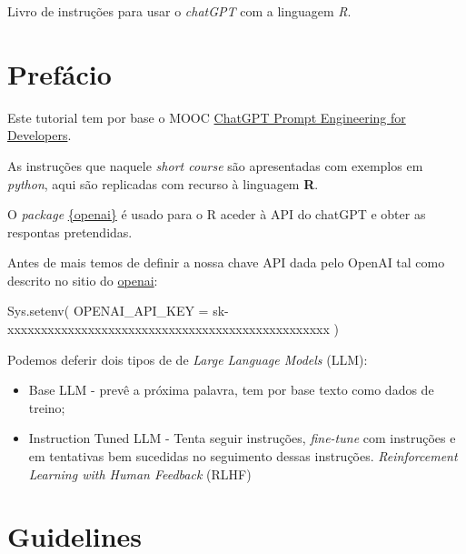 \documentclass[
  letterpaper,
  paper=6in:9in,
  pagesize=pdftex,
  headinclude=on,
  footinclude=on,
  12pt]{scrbook}
\newenvironment{Shaded}{\begin{snugshade}}{\end{snugshade}}
\newcommand{\AttributeTok}[1]{\textcolor[rgb]{0.40,0.45,0.13}{#1}}
\newcommand{\FunctionTok}[1]{\textcolor[rgb]{0.28,0.35,0.67}{#1}}
\newcommand{\NormalTok}[1]{\textcolor[rgb]{0.00,0.23,0.31}{#1}}
\newcommand{\StringTok}[1]{\textcolor[rgb]{0.13,0.47,0.30}{#1}}
\begin{document}
Livro de instruções para usar o \emph{chatGPT} com a linguagem \emph{R}.


\hypertarget{prefuxe1cio}{%
\chapter{Prefácio}\label{prefuxe1cio}}

Este tutorial tem por base o MOOC
\href{https://learn.deeplearning.ai/}{ChatGPT Prompt Engineering for
Developers}.

As instruções que naquele \emph{short course} são apresentadas com
exemplos em \emph{python}, aqui são replicadas com recurso à linguagem
\textbf{R}.

O \emph{package}
\href{https://cloud.r-project.org/web/packages/openai/index.html}{\{openai\}}
é usado para o R aceder à API do chatGPT e obter as respontas
pretendidas.

Antes de mais temos de definir a nossa chave API dada pelo OpenAI tal
como descrito no sitio do
\href{https://irudnyts.github.io/openai/}{openai}:

\begin{Shaded}
\begin{Highlighting}[]
\FunctionTok{Sys.setenv}\NormalTok{(}
    \AttributeTok{OPENAI\_API\_KEY =} \StringTok{\textquotesingle{}sk{-}xxxxxxxxxxxxxxxxxxxxxxxxxxxxxxxxxxxxxxxxxxxxxxxx\textquotesingle{}}
\NormalTok{)}
\end{Highlighting}
\end{Shaded}

Podemos deferir dois tipos de de \emph{Large Language Models} (LLM):

\begin{itemize}
\item
  Base LLM - prevê a próxima palavra, tem por base texto como dados de
  treino;
\item
  Instruction Tuned LLM - Tenta seguir instruções, \emph{fine-tune} com
  instruções e em tentativas bem sucedidas no seguimento dessas
  instruções. \emph{Reinforcement Learning with Human Feedback} (RLHF)
\end{itemize}


\hypertarget{guidelines}{%
\chapter{Guidelines}\label{guidelines}}
\end{document}
